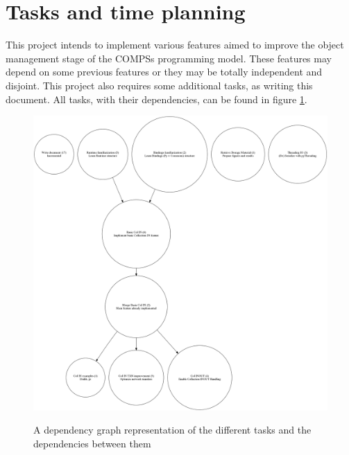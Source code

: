 \section{Tasks and time planning}
This project intends to implement various features aimed to improve the object management stage of the COMPSs programming model. These features may depend on some previous features or they may be totally independent and disjoint. This project also requires some additional tasks, as writing this document. All tasks, with their dependencies, can be found in figure \ref{fig:thesis_task_graph}.

\begin{figure}[ht!]
\centering
\includegraphics[scale = 0.25]{figures/thesis_task_graph.png}
\label{fig:thesis_task_graph}
\caption{A dependency graph representation of the different tasks and the dependencies between them}
\end{figure}
